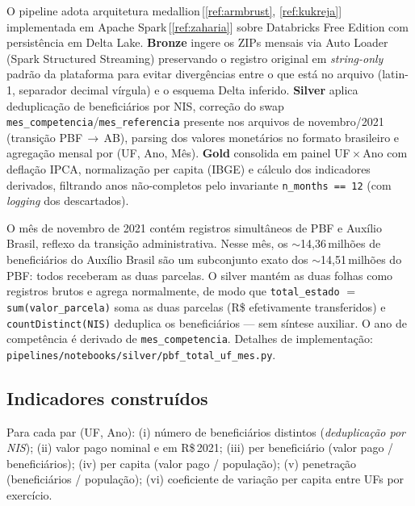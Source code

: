 \documentclass[12pt,a4paper,oneside]{article}
\newcommand{\rs}{R\$\,}
\begin{document}
O pipeline adota arquitetura medallion\,[\ref{ref:armbrust},
\ref{ref:kukreja}] implementada em Apache
Spark\,[\ref{ref:zaharia}] sobre Databricks Free Edition com
persistência em Delta Lake.
\textbf{Bronze} ingere os ZIPs mensais via Auto Loader (Spark
Structured Streaming) preservando o registro original em
\textit{string-only} \textemdash{} padrão da plataforma para evitar
divergências entre o que está no arquivo (latin-1, separador
decimal vírgula) e o esquema Delta inferido.
\textbf{Silver} aplica deduplicação de beneficiários por NIS,
correção do swap \texttt{mes\_competencia}/\texttt{mes\_referencia}
presente nos arquivos de novembro/2021 (transição PBF\,$\to$\,AB),
parsing dos valores monetários no formato brasileiro e agregação
mensal por (UF, Ano, Mês).
\textbf{Gold} consolida em painel UF\,$\times$\,Ano com deflação
IPCA, normalização per capita (IBGE) e cálculo dos indicadores
derivados, filtrando anos não-completos pelo invariante
\texttt{n\_months == 12} (com \textit{logging} dos descartados).

\begin{tcolorbox}[
  colback=blue!2,colframe=blue!60!black,
  boxrule=0.6pt,arc=2pt,
  left=8pt,right=8pt,top=4pt,bottom=4pt,
  title={\small\textbf{Nota metodológica — tratamento da transição PBF\,$\to$\,AB em novembro de 2021}},
  fonttitle=\small\bfseries,
  ]\small
O mês de novembro de 2021 contém registros simultâneos de PBF e
Auxílio Brasil, reflexo da transição administrativa. Nesse mês,
os $\sim$14,36\,milhões de beneficiários do Auxílio Brasil são um
subconjunto exato dos $\sim$14,51\,milhões do PBF: todos receberam as
duas parcelas. O silver mantém as duas folhas como registros brutos e
agrega normalmente, de modo que \texttt{total\_estado} $=$
\texttt{sum(valor\_parcela)} soma as duas parcelas (R\$ efetivamente
transferidos) e \texttt{countDistinct(NIS)} deduplica os beneficiários
— sem síntese auxiliar. O ano de competência é derivado de
\texttt{mes\_competencia}. Detalhes de implementação:
\texttt{pipelines/notebooks/silver/pbf\_total\_uf\_mes.py}.
\end{tcolorbox}

\subsection{Indicadores construídos}

Para cada par (UF, Ano): (i) número de beneficiários distintos
(\textit{deduplicação por NIS});
(ii) valor pago nominal e em \rs 2021;
(iii) per beneficiário (valor pago / beneficiários);
(iv) per capita (valor pago / população);
(v) penetração (beneficiários / população);
(vi) coeficiente de variação per capita entre UFs por exercício.
\end{document}
